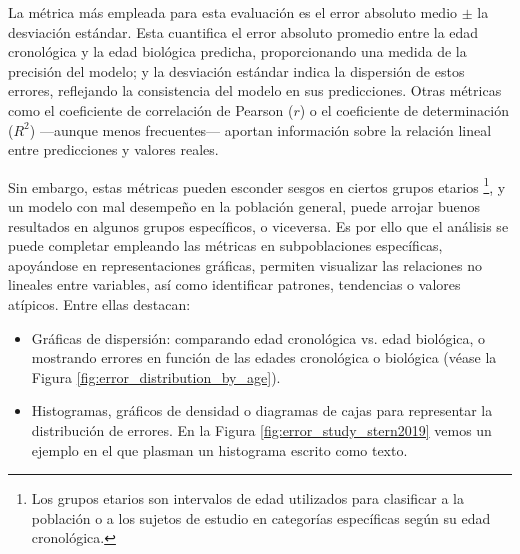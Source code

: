 La métrica más empleada para esta evaluación es el error absoluto medio $\pm$ la desviación estándar. 
Esta cuantifica el error absoluto promedio entre la edad cronológica y la edad biológica predicha, 
proporcionando una medida de la precisión del modelo; y la desviación estándar indica la dispersión de 
estos errores, reflejando la consistencia del modelo en sus predicciones.
Otras métricas como el coeficiente de correlación de Pearson ($r$) o el coeficiente de determinación ($R^2$) 
---aunque menos frecuentes--- aportan información sobre la relación lineal entre predicciones y 
valores reales.

Sin embargo, estas métricas pueden esconder sesgos en ciertos grupos etarios
\footnote{
    Los grupos etarios son intervalos de edad utilizados para clasificar a la población o a los sujetos de 
    estudio en categorías específicas según su edad cronológica.
}, y un modelo con mal desempeño en la población general, puede arrojar buenos resultados en algunos grupos 
específicos, o viceversa.
Es por ello que el análisis se puede completar empleando las métricas en subpoblaciones específicas,  
apoyándose en representaciones gráficas, permiten visualizar las relaciones no lineales entre variables,
así como identificar patrones, tendencias o valores atípicos. Entre ellas destacan: 

\begin{itemize}
    \item Gráficas de dispersión: comparando edad cronológica vs. edad biológica, o mostrando errores en 
    función de las edades cronológica o biológica (véase la Figura \ref{fig:error_distribution_by_age}).

    \item Histogramas, gráficos de densidad o diagramas de cajas para representar la distribución de errores.
    En la Figura \ref{fig:error_study_stern2019} vemos un ejemplo en el que plasman un histograma escrito 
    como texto.

\end{itemize}

